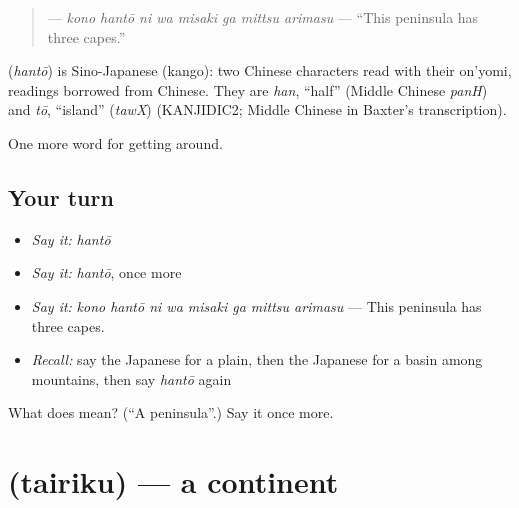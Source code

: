 \begin{quote}
\textbf{    } — \emph{kono hantō ni wa misaki ga mittsu arimasu} — \textquotedblleft{}This peninsula has three capes.\textquotedblright{}
\end{quote}

\begin{cousinweb}
\textbf{} (\emph{hantō}) is Sino-Japanese (kango): two Chinese characters read with their on'yomi, readings borrowed from Chinese. They are \emph{han}, \textquotedblleft{}half\textquotedblright{} (Middle Chinese \emph{panH}) and \emph{tō}, \textquotedblleft{}island\textquotedblright{} (\emph{tawX}) (KANJIDIC2; Middle Chinese in Baxter's transcription).
\end{cousinweb}

\begin{grammarlens}[title={What you've built}]
One more word for getting around.
\end{grammarlens}

\subsection*{Your turn}
\begin{itemize}
\raggedright
  \item \emph{Say it:} \emph{hantō}
  \item \emph{Say it:} \emph{hantō}, once more
  \item \emph{Say it:} \emph{kono hantō ni wa misaki ga mittsu arimasu} — This peninsula has three capes.
  \item \emph{Recall:} say the Japanese for a plain, then the Japanese for a basin among mountains, then say \emph{hantō} again
\end{itemize}

\begin{tcolorbox}[breakable,colback=teal!4,colframe=teal!35!black,title={Before you move on}]
What does  mean? (\textquotedblleft{}A peninsula\textquotedblright{}.) Say it once more.
\end{tcolorbox}
\section[\texorpdfstring{\ja{たいりく} (tairiku)}{たいりく (tairiku)}]{ (tairiku) — a continent}

\label{lesson:JA-C413-tairiku}



